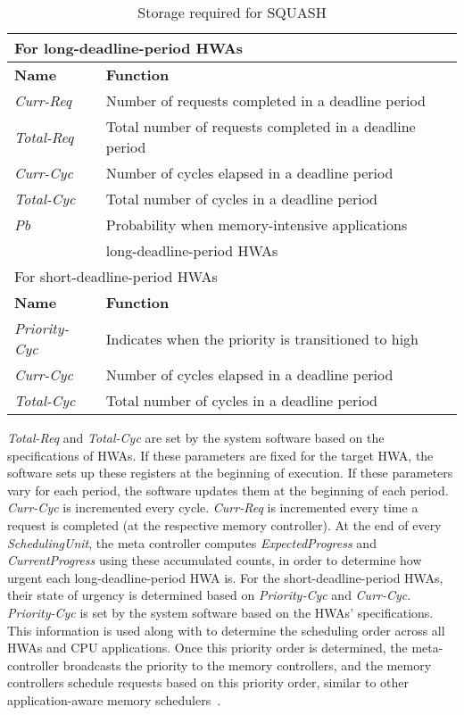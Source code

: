 \documentclass[10pt,letterpaper]{article}
\begin{document}
\begin{table}[h!]
\vspace{-3mm}
\footnotesize
  \centering
  \begin{tabular}{|l|l|}
    \hline
    \multicolumn{2}{|l|}{For long-deadline-period HWAs} \\
    \hline
    \textbf{Name} & \textbf{Function} \\
    \hline
    {\it Curr-Req} & Number of requests completed in a
    deadline period\\
    \hline
    {\it Total-Req} & Total number of requests completed in a
    deadline period\\
    \hline
    {\it Curr-Cyc} & Number of cycles elapsed in a deadline period\\
    \hline
    {\it Total-Cyc} & Total number of cycles in a deadline period\\
    \hline
    {\it Pb} & Probability when memory-intensive applications \\
    &  long-deadline-period HWAs \\
    \hline
    \hline
    \multicolumn{2}{|l|}{For short-deadline-period HWAs} \\
    \hline
    \textbf{Name} & \textbf{Function} \\
    \hline
    {\it Priority-Cyc} & Indicates when the priority is transitioned to high \\
    \hline
    {\it Curr-Cyc} & Number of cycles elapsed in a deadline period\\
    \hline
    {\it Total-Cyc} & Total number of cycles in a deadline period\\
    \hline
  \end{tabular}
\vspace{-2mm}
\caption{Storage required for SQUASH}
\label{tab:storage}
\vspace{-3mm}
\end{table}

{\it Total-Req} and {\it Total-Cyc} are set by the system software based on the
specifications of HWAs. If these parameters are fixed for the target HWA, the
software sets up these registers at the beginning of execution. If these
parameters vary for each period, the software
updates them at the beginning of each period. {\it Curr-Cyc} is incremented
every cycle. {\it Curr-Req} is incremented every time a request is completed (at
the respective memory controller). At the end of every {\it SchedulingUnit}, the
meta controller computes {\it ExpectedProgress} and {\it CurrentProgress} using
these accumulated counts, in order to determine how urgent each
long-deadline-period HWA is. For the short-deadline-period HWAs, their state of
urgency is determined based on {\it Priority-Cyc} and {\it Curr-Cyc}. {\it
Priority-Cyc} is set by the system software based on the HWAs' specifications.
This information is used along with  to determine the scheduling order
across all HWAs and CPU applications. Once this priority order is determined,
the meta-controller broadcasts the priority to the memory controllers, and the
memory controllers schedule requests based on this priority order, similar to
other application-aware memory schedulers~\cite{stfm,parbs,atlas,tcm}.
\end{document}
